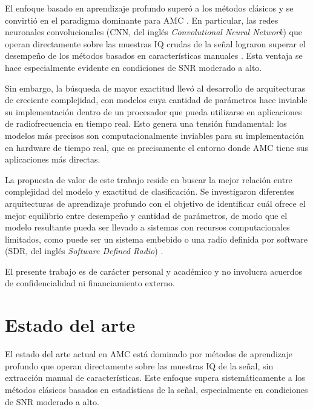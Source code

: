 El enfoque basado en aprendizaje profundo superó a los métodos clásicos y se convirtió en el paradigma dominante para AMC \cite{oshea2017introduction}. En particular, las redes neuronales convolucionales (CNN, del inglés \textit{Convolutional Neural Network}) que operan directamente sobre las muestras IQ crudas de la señal lograron superar el desempeño de los métodos basados en características manuales \cite{oshea2016convolutional}. Esta ventaja se hace especialmente evidente en condiciones de SNR moderado a alto.

Sin embargo, la búsqueda de mayor exactitud llevó al desarrollo de arquitecturas de creciente complejidad, con modelos cuya cantidad de parámetros hace inviable su implementación dentro de un procesador que pueda utilizarse en aplicaciones de radiofrecuencia en tiempo real. Esto genera una tensión fundamental: los modelos más precisos son computacionalmente inviables para su implementación en hardware de tiempo real, que es precisamente el entorno donde AMC tiene sus aplicaciones más directas.

La propuesta de valor de este trabajo reside en buscar la mejor relación entre complejidad del modelo y exactitud de clasificación. Se investigaron diferentes arquitecturas de aprendizaje profundo con el objetivo de identificar cuál ofrece el mejor equilibrio entre desempeño y cantidad de parámetros, de modo que el modelo resultante pueda ser llevado a sistemas con recursos computacionales limitados, como puede ser un sistema embebido o una radio definida por software (SDR, del inglés \textit{Software Defined Radio}) \cite{mitola1995software}.

El presente trabajo es de carácter personal y académico y no involucra acuerdos de confidencialidad ni financiamiento externo.


\section{Estado del arte}
\label{sec:estadoArte}

El estado del arte actual en AMC está dominado por métodos de aprendizaje profundo que operan directamente sobre las muestras IQ de la señal, sin extracción manual de características. Este enfoque supera sistemáticamente a los métodos clásicos basados en estadísticas de la señal, especialmente en condiciones de SNR moderado a alto.

